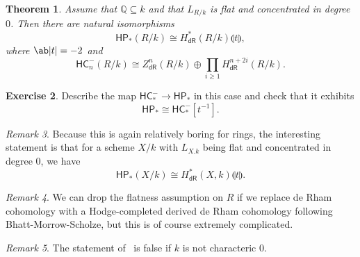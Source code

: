 \documentclass[10pt, oneside]{memoir}
\newtheorem{thm}{Theorem}[subsection]
\theoremstyle{definition}
\newtheorem{exer}[thm]{Exercise}
\theoremstyle{remark}
\newtheorem{rmk}[thm]{Remark}
\theoremstyle{plain}
\theoremstyle{definition}
\theoremstyle{remark}
\newcommand{\Q}{\mathbb{Q}}
\newcommand{\ms}[1]{\mathsf{#1}}
\newcommand{\1}{\mathbf{1}}
\newcommand{\2}{\mathbf{2}}
\newcommand{\3}{\mathbf{3}}
\newcommand{\ls}[1]{\llparenthesis #1 \rrparenthesis}
\newcommand{\HC}{\ms{HC}}
\newcommand{\HP}{\ms{HP}}
\newcommand{\dR}{\ms{dR}}
\begin{document}
\begin{thm}\label{thm:hpequalsdr}
    Assume that \(\Q \subseteq k \) and that \(L_{R/k} \) is flat and concentrated in degree \(0 \). Then there are natural isomorphisms
    \[ \HP_*(R/k) \cong H_{\dR}^*(R/k) \ls{t}, \]
    where \(\ab|t| = -2 \) and
    \[ \HC_n^-(R/k) \cong Z_{\dR}^n(R/k) \oplus \prod_{i \geq 1} H_{\dR}^{n+2i}(R/k). \]
\end{thm}

\begin{exer}
    Describe the map \(\HC_*^- \to \HP_* \) in this case and check that it exhibits
    \[ \HP_* \cong \HC_*^-[t^{-1}]. \]
\end{exer}

\begin{rmk}
    Because this is again relatively boring for rings, the interesting statement is that for a scheme \(X/k \) with \(L_{X.k} \) being flat and concentrated in degree \(0 \), we have
    \[ \HP_*(X/k) \cong H_{\dR}^*(X,k) \ls{t}. \]
\end{rmk}

\begin{rmk}
    We can drop the flatness assumption on \(R \) if we replace de Rham cohomology with a Hodge-completed derived de Rham cohomology following Bhatt-Morrow-Scholze, but this is of course extremely complicated.
\end{rmk}

\begin{rmk}
    The statement of~ is false if \(k \) is not characteric \(0 \).
\end{rmk}
\end{document}
